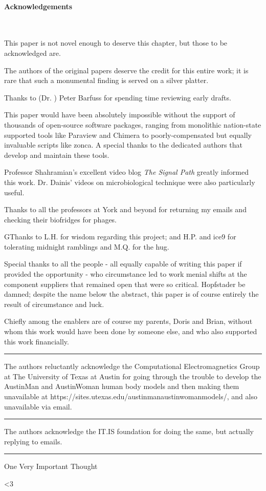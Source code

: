 \documentclass[paper.tex]{subfiles}
\begin{document}
	
\clearpage
\paragraph{Acknowledgements}\

This paper is not novel enough to deserve this chapter, but those to be acknowledged are.

The authors of the original papers deserve the credit for this entire work; it is rare that such a monumental finding is served on a silver platter.

Thanks to (Dr. ) Peter Barfuss for spending time reviewing early drafts.

This paper would have been absolutely impossible without the support of thousands of open-source software packages, ranging from monolithic nation-state supported tools like Paraview and Chimera to poorly-compensated but equally invaluable scripts like zonca. A special thanks to the dedicated authors that develop and maintain these tools.

Professor Shahramian's excellent video blog {\it The Signal Path} greatly informed this work. Dr. Dainis' videos on microbiological technique were also particularly useful.

Thanks to all the professors at York and beyond for returning my emails and checking their biofridges for phages.

GThanks to L.H. for wisdom regarding this project; and H.P. and ice9 for tolerating midnight ramblings and M.Q. for the hug.

Special thanks to all the people - all equally capable of writing this paper if provided the opportunity - who circumstance led to work menial shifts at the component suppliers that remained open that were so critical. Hopfstader be damned; despite the name below the abstract, this paper is of course entirely the result of circumstance and luck. 

Chiefly among the enablers are of course my parents, Doris and Brian, without whom this work would have been done by someone else, and who also supported this work financially. 



\rule{\linewidth}{0.2pt}

The authors reluctantly acknowledge the Computational Electromagnetics Group at The University of Texas at Austin for going through the trouble to develop the AustinMan and AustinWoman human body models and then making them unavailable at https://sites.utexas.edu/austinmanaustinwomanmodels/, and also unavailable via email.

\rule{\linewidth}{0.2pt}

The authors acknowledge the IT.IS foundation for doing the same, but actually replying to emails.

\rule{\linewidth}{0.2pt}

One Very Important Thought



{\Large <3}
\end{document}
